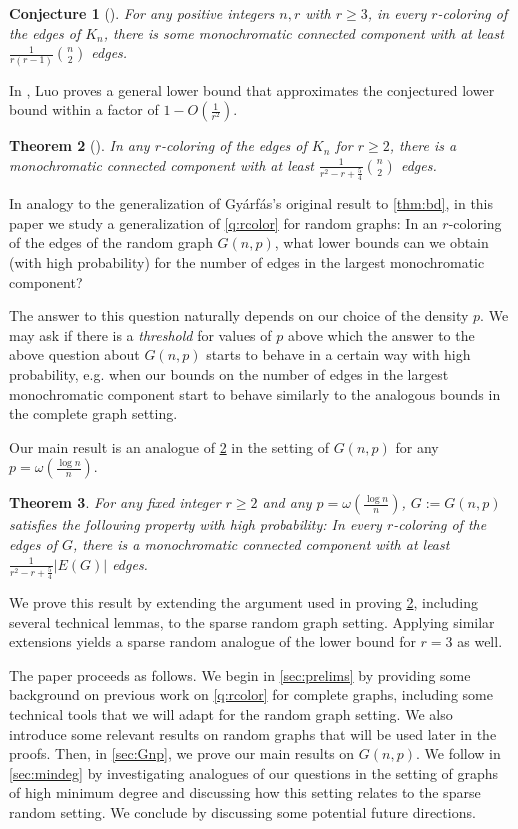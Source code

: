 \documentclass[12pt]{amsart}
\newtheorem{theorem}{Theorem}[section]
\newtheorem{conj}[theorem]{Conjecture}
\theoremstyle{definition}
\numberwithin{equation}{section}
\begin{document}
\begin{conj}[\cite{clt}]\label{conj:rKn}
    For any positive integers $n,r$ with $r\ge 3$, in every $r$-coloring of the edges of $K_n$, there is some monochromatic connected component with at least $\frac{1}{r(r-1)}\binom{n}{2}$ edges.  
\end{conj}
In \cite{sluo}, Luo proves a general lower bound that approximates the conjectured lower bound within a factor of $1-O(\frac{1}{r^2})$.

\begin{theorem}[\cite{sluo}]\label{thm:rKn}
In any $r$-coloring of the edges of $K_n$ for $r\ge 2$, there is a monochromatic connected component with at least $\frac{1}{r^2-r+\frac54}{n\choose 2}$ edges.
\end{theorem}

In analogy to the generalization of Gy\'arf\'as's original result to \cref{thm:bd}, in this paper we study a generalization of \cref{q:rcolor} for random graphs: In an $r$-coloring of the edges of the random graph $G(n, p)$, what lower bounds 
can we obtain (with high probability) for the number of edges in the largest monochromatic component?

The answer to this question naturally depends on our choice of the density $p$. We may ask if there is a \textit{threshold} for values of $p$ above which the answer to the above question about $G(n,p)$ starts to behave in a certain way with high probability, e.g. when our bounds on the number of edges in the largest monochromatic component start to behave similarly to the analogous bounds in the complete graph setting.

Our main result is an analogue of \cref{thm:rKn} in the setting of $G(n, p)$ for any $p= \omega(\frac{\log n}{n})$.
\begin{theorem} 
    \label{thm:main}
    For any fixed integer $r\ge 2$ and any $p=\omega(\frac{\log n}n)$, 
    $G:=G(n, p)$ satisfies the following property with high probability: In every $r$-coloring of the edges of $G$,    
    there is a monochromatic connected 
    component with at least $\frac{1}{r^2-r+\frac54}|E(G)|$ edges.
\end{theorem}
We prove this result by extending the argument used in proving \cref{thm:rKn}, including several technical lemmas, to the sparse random graph setting. Applying similar extensions yields a sparse random analogue of the lower bound for $r=3$ as well.

The paper proceeds as follows. We begin in \cref{sec:prelims} by providing some background on previous work on \cref{q:rcolor} for complete graphs, including some technical tools that we will adapt for the random graph setting. We also introduce some relevant results on random graphs that will be used later in the proofs. Then, in \cref{sec:Gnp}, we prove our main results on $G(n,p)$. We follow in \cref{sec:mindeg} by investigating analogues of our questions in the setting of graphs of high minimum degree and discussing how this setting relates to the sparse random setting. We conclude by discussing some potential future directions.
\bigskip
\end{document}
